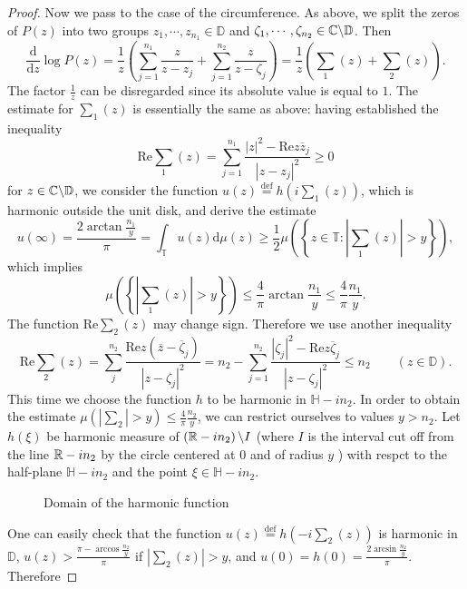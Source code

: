 \begin{proof}
Now we pass to the case of the circumference. As above, we split the zeros of $P(z)$ into two groups $z_1,\cdots,z_{n_1}\in \mathbb{D}$ and $\zeta_1,\cdots,\zeta_{n_2}\in \mathbb{C} \backslash \mathbb{D}$. Then 
\[
  \frac{\mathrm{d}}{\mathrm{d}z}\log P(z) = \frac{1}{z}\left( \sum_{j=1}^{n_1} \frac{z}{z-z_j}+\sum_{j=1}^{n_2} \frac{z}{z-\zeta_j} \right) =\frac{1}{z}\left( \sum_1(z)+\sum_2(z) \right) .
\] 
The factor $\frac{1}{z}$ can be disregarded since its absolute value is equal to $1$. The estimate for $\sum_1 (z)$ is essentially the same as above: having established the inequality 
\[
  \mathrm{Re} \sum_{1}^{} (z)=\sum_{j=1}^{n_1} \frac{\left| z \right| ^2-\mathrm{Re}z \overline{z}_j}{\left| z-z_j \right| ^2}\ge 0
\] 
for $z\in \mathbb{C}\backslash \mathbb{D}$, we consider the function $u(z)\overset{\mathrm{def}}{=} h\left( i\sum_1(z) \right) $, which is harmonic outside the unit disk, and derive the estimate
\[
  u(\infty)= \frac{2\arctan \frac{n_1}{y}}{\pi}=\int_{\mathbb{T}}u(z)\mathrm{d}\mu(z)\ge \frac{1}{2}\mu\left( \left\{ z\in \mathbb{T}:\left| \sum_1(z) \right| >y \right\}  \right) ,
\] 
which implies 
\[
  \mu\left( \left\{ \left| \sum_1(z) \right| >y \right\}  \right) \le \frac{4}{\pi}\arctan \frac{n_1}{y}\le \frac{4}{\pi} \frac{n_1}{y}.
\] 
The function $\mathrm{Re} \sum_2(z)$ may change sign. Therefore we use another inequality
\[
  \mathrm{Re} \sum_{2}(z)= \sum_{j}^{n_2} \frac{\mathrm{Re}z(\overline{z}-\overline{\zeta}_j)}{\left| z-\zeta_j \right| ^2} =n_2-\sum_{j=1}^{n_2} \frac{\left| \zeta_j \right| ^2-\mathrm{Re}z \overline{\zeta}_j}{\left| z-\zeta_j \right| ^2}\le  n_2\qquad (z\in \mathbb{D}).
\] 
This time we choose the function $h$ to be harmonic in $\mathbb{H}-in_2$. In order to obtain the estimate $\mu\left( \left| \sum_2 \right| >y \right) \le \frac{4}{\pi}\frac{n_2}{y}$, we can restrict ourselves to values $y>n_2$. Let $h(\xi)$ be harmonic measure of $\left( \mathbb{R}-in_2 \right) \backslash I$ (where $I$ is the interval cut off from the line $\mathbb{R}-in_2$ by the circle centered at $0$ and of radius $y$ ) with respct to the half-plane $\mathbb{H}-in_2$ and the point $\xi \in  \mathbb{H}-in_2$.
\begin{figure}[ht]
    \centering
    \caption{Domain of the harmonic function}
    \label{fig:harmonic-function-3}
\end{figure}
One can easily check that the function $u(z)\overset{\mathrm{def}}{=}h\left( -i\sum_2(z) \right) $ is harmonic in $\mathbb{D}$,  $u(z)> \frac{\pi-\arccos \frac{n_2}{y}}{\pi}$ if $\left| \sum_{2}(z) \right| >y$, and $u(0)=h(0)= \frac{2\arcsin \frac{n_2}{y}}{\pi}$. Therefore

\end{proof}

